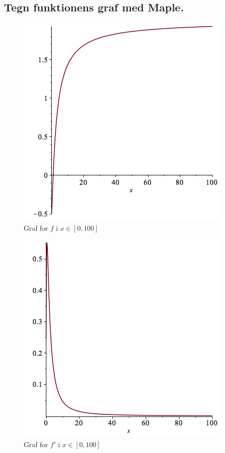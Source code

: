 \documentclass[11pt,a4paper]{article}
\begin{document}
\subsection{\mdseries Tegn funktionens graf med Maple.}
\begin{multicols}{2}
    \begin{figure}[H]
        \label{fig:2.2-a}
        \includegraphics[scale=0.5]{figures/2-2a-fig-1.png}
        \caption{Graf for $f$ i $x \in [0,100]$}
    \end{figure}
    \vfill\columnbreak
    \begin{figure}[H]
        \label{fig:2.2b}
        \includegraphics[scale=0.5]{figures/2-2b-fig-1.png}
        \caption{Graf for $f'$ i $x \in [0,100]$}
    \end{figure}
\end{multicols}
\end{document}

